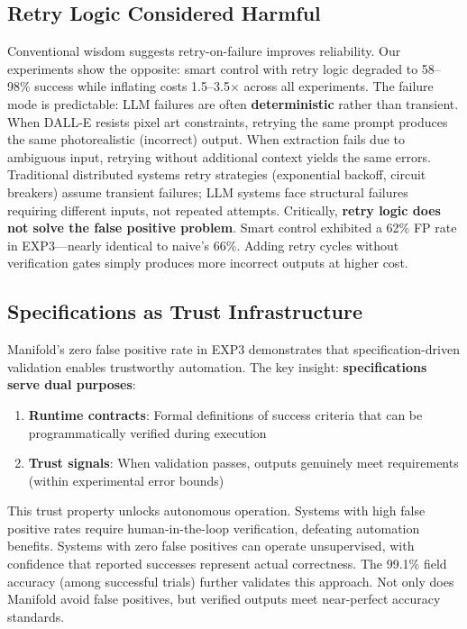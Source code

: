 \documentclass{article}
\begin{document}
\subsection{Retry Logic Considered Harmful}
Conventional wisdom suggests retry-on-failure improves reliability. Our experiments show the opposite: smart control with retry logic degraded to 58--98\% success while inflating costs 1.5--3.5$\times$ across all experiments.
The failure mode is predictable: LLM failures are often \textbf{deterministic} rather than transient. When DALL-E resists pixel art constraints, retrying the same prompt produces the same photorealistic (incorrect) output. When extraction fails due to ambiguous input, retrying without additional context yields the same errors. Traditional distributed systems retry strategies (exponential backoff, circuit breakers) assume transient failures; LLM systems face structural failures requiring different inputs, not repeated attempts.
Critically, \textbf{retry logic does not solve the false positive problem}. Smart control exhibited a 62\% FP rate in EXP3---nearly identical to naive's 66\%. Adding retry cycles without verification gates simply produces more incorrect outputs at higher cost.

\subsection{Specifications as Trust Infrastructure}
Manifold's zero false positive rate in EXP3 demonstrates that specification-driven validation enables trustworthy automation. The key insight: \textbf{specifications serve dual purposes}:
\begin{enumerate}
\item \textbf{Runtime contracts}: Formal definitions of success criteria that can be programmatically verified during execution
\item \textbf{Trust signals}: When validation passes, outputs genuinely meet requirements (within experimental error bounds)
\end{enumerate}
This trust property unlocks autonomous operation. Systems with high false positive rates require human-in-the-loop verification, defeating automation benefits. Systems with zero false positives can operate unsupervised, with confidence that reported successes represent actual correctness.
The 99.1\% field accuracy (among successful trials) further validates this approach. Not only does Manifold avoid false positives, but verified outputs meet near-perfect accuracy standards.
\end{document}
